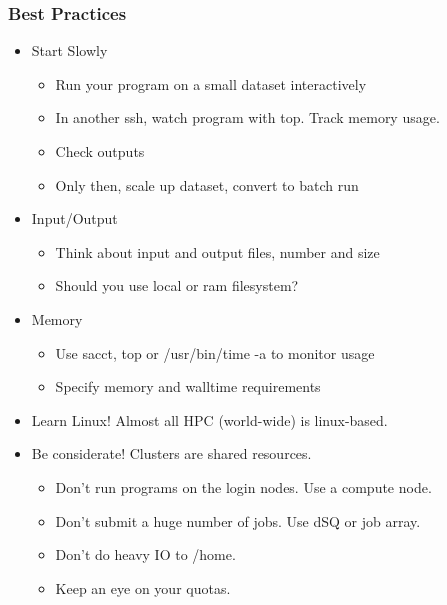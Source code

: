 \documentclass[10pt]{beamer}
\begin{document}
\begin{frame}[fragile]
\frametitle{Best Practices}

\begin{itemize}
\item Start Slowly
\begin{itemize}
\item Run your program on a small dataset interactively
\item In another ssh, watch program with top.  Track memory usage.
\item Check outputs
\item Only then, scale up dataset, convert to batch run
\end{itemize}
\item Input/Output
\begin{itemize}
\item Think about input and output files, number and size
\item Should you use local or ram filesystem? 
\end{itemize}
\item Memory

\begin{itemize}
\item Use sacct, top or /usr/bin/time -a to monitor usage
\item Specify memory and walltime requirements
\end{itemize}

\item Learn Linux! Almost all HPC (world-wide) is linux-based.
\item Be considerate!  Clusters are shared resources.

\begin{itemize}
\item Don't run programs on the login nodes.  Use a compute node.
\item Don't submit a huge number of jobs.  Use dSQ or job array.
\item Don't do heavy IO to /home.
\item Keep an eye on your quotas. 
\end{itemize}
\end{itemize}

\end{frame}
\end{document}
